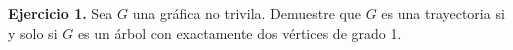 \textbf{Ejercicio 1.} Sea $G$ una gráfica no trivila. Demuestre que $G$ es una 
trayectoria si y solo si $G$ es un árbol con exactamente dos vértices de grado 1.